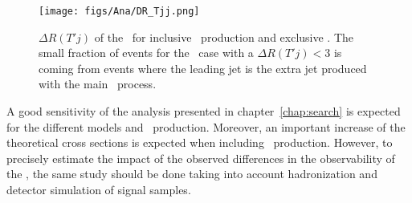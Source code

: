 \begin{figure}[!hbtp]
  \begin{center}
    \texttt{[image: figs/Ana/DR\_Tjj.png]}
    \caption{$\Delta R (T'j)$ of the \Tp~for inclusive \Tjj~production and exclusive \Tj. The small fraction of events for the \Tjj~case with a $\Delta R (T'j)<3$ is coming from events where the leading jet is the extra jet produced with the main \Tj~process.}
    \label{fig:DR_Tjj}
  \end{center}
\end{figure}

A good sensitivity of the analysis presented in chapter~\ref{chap:search} is expected for the different models and \Tjj~production. Moreover, an important increase of the theoretical cross sections is expected when including \Tjj~production. However, to precisely estimate the impact of the observed differences in the observability of the \Tp, the same study should be done taking into account hadronization and detector simulation of signal samples. 
